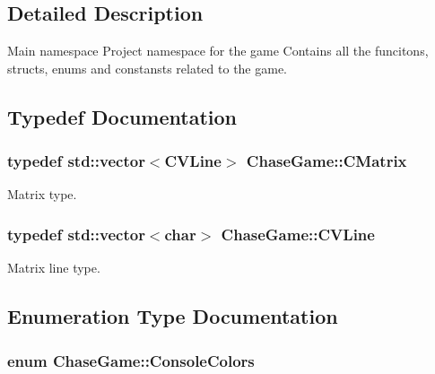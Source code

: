 \subsection{Detailed Description}
Main namespace Project namespace for the game Contains all the funcitons, structs, enums and constansts related to the game. 

\subsection{Typedef Documentation}
\hypertarget{namespace_chase_game_a469449f9237e59efce3982127366c550}{
\subsubsection[{C\-Matrix}]{\setlength{\rightskip}{0pt plus 5cm}typedef std\-::vector$<${\bf C\-V\-Line}$>$ {\bf Chase\-Game\-::\-C\-Matrix}}}\label{namespace_chase_game_a469449f9237e59efce3982127366c550}


Matrix type. 

\hypertarget{namespace_chase_game_aa09cf1806d3b1f59d36cfabadeaca6a2}{
\subsubsection[{C\-V\-Line}]{\setlength{\rightskip}{0pt plus 5cm}typedef std\-::vector$<$char$>$ {\bf Chase\-Game\-::\-C\-V\-Line}}}\label{namespace_chase_game_aa09cf1806d3b1f59d36cfabadeaca6a2}


Matrix line type. 



\subsection{Enumeration Type Documentation}
\hypertarget{namespace_chase_game_a5acdf639e912d1e78814b7fae21afc7b}{
\subsubsection[{Console\-Colors}]{\setlength{\rightskip}{0pt plus 5cm}enum {\bf Chase\-Game\-::\-Console\-Colors}}}\label{namespace_chase_game_a5acdf639e912d1e78814b7fae21afc7b}


